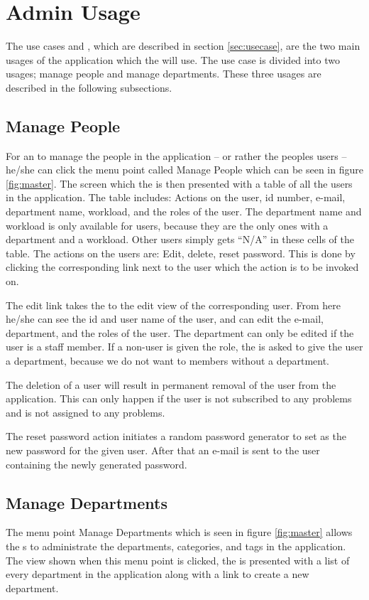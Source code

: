 \section{Admin Usage}
\label{sec:admin_usage}
The use cases \tucadmin[] and \gstat[], which are described in section \ref{sec:usecase}, are the two main usages of the application which the \admin[] will use.
The \tucadmin[] use case is divided into two usages; manage people and manage departments.
These three usages are described in the following subsections.

\subsection{Manage People}
\label{sub:managePeople}
For an \admin[] to manage the people in the application -- or rather the peoples users -- he/she can click the menu point called Manage People which can be seen in figure \ref{fig:master}.
The screen which the \admin[] is then presented with a table of all the users in the application.
The table includes: Actions on the user, id number, e-mail, department name, workload, and the roles of the user.
The department name and workload is only available for \astaff[] users, because they are the only ones with a department and a workload.
Other users simply gets ``N/A'' in these cells of the table.
The actions on the users are: Edit, delete, reset password.
This is done by clicking the corresponding link next to the user which the action is to be invoked on.

The edit link takes the \admin[] to the edit view of the corresponding user.
From here he/she can see the id and user name of the user, and can edit the e-mail, department, and the roles of the user.
The department can only be edited if the user is a staff member.
If a non-\astaff[] user is given the \astaff[] role, the \admin[] is asked to give the user a department, because we do not want to \astaff[] members without a department.

The deletion of a user will result in permanent removal of the user from the application.
This can only happen if the user is not subscribed to any problems and is not assigned to any problems.

The reset password action initiates a random password generator to set as the new password for the given user.
After that an e-mail is sent to the user containing the newly generated password.

\subsection{Manage Departments}
The menu point Manage Departments which is seen in figure \ref{fig:master} allows the \admin[]s to administrate the departments, categories, and tags in the application.
The view shown when this menu point is clicked, the \admin[] is presented with a list of every department in the application along with a link to create a new department.

